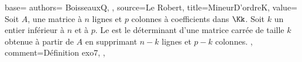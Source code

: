 {
  base={
    authors={
      BoisseauxQ,
    },
    source=Le Robert,
    title=MineurD'ordreK,
    value={
      Soit $A$, une matrice à $n$ lignes et $p$ colonnes à coefficients dans $\Kk$. Soit $k$ un entier inférieur à $n$ et à $p$. Le  est le déterminant d’une matrice carrée de taille $k$ obtenue à partir de $A$ en supprimant $n-k$ lignes et $p-k$ colonnes.
    },
    comment={Définition exo7},
  },
}
